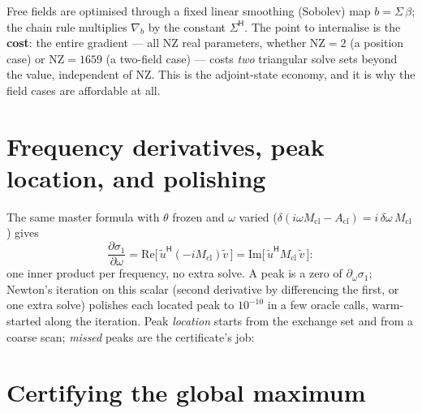 \documentclass[11pt,a4paper]{article}
\newcommand{\Mcl}{M_{\mathrm{cl}}}
\newcommand{\Acl}{A_{\mathrm{cl}}}
\newcommand{\hp}{^{\mathsf H}}
\begin{document}
{\noindent
Free fields are optimised through a fixed linear smoothing (Sobolev) map
$b=\Sigma\,\beta$; the chain rule multiplies $\nabla_b$ by the constant $\Sigma\hp$.
The point to internalise is the \textbf{cost}: the entire gradient --- all
$\mathrm{NZ}$ real parameters, whether $\mathrm{NZ}=2$ (a position case) or
$\mathrm{NZ}=1659$ (a two-field case) --- costs \emph{two} triangular solve sets beyond
the value, independent of $\mathrm{NZ}$.  This is the adjoint-state economy, and it is why
the field cases are affordable at all.

\section{Frequency derivatives, peak location, and polishing}

The same master formula with $\theta$ frozen and $\omega$ varied
($\delta(i\omega\Mcl-\Acl) = i\,\delta\omega\,\Mcl$) gives
\[
\frac{\partial\sigma_1}{\partial\omega}
= \mathrm{Re}\bigl[\,\tilde u\hp(-i\Mcl)\tilde v\,\bigr]
= \mathrm{Im}\bigl[\,\tilde u\hp \Mcl\,\tilde v\,\bigr]:
\]
one inner product per frequency, no extra solve.  A peak is a zero of
$\partial_\omega\sigma_1$; Newton's iteration on this scalar (second derivative by
differencing the first, or one extra solve) polishes each located peak to $10^{-10}$ in a
few oracle calls, warm-started along the iteration.  Peak \emph{location} starts from the
exchange set and from a coarse scan; \emph{missed} peaks are the certificate's job:

\section{Certifying the global maximum}\label{sec:cert}
\label{sec:cert}

}
\end{document}
